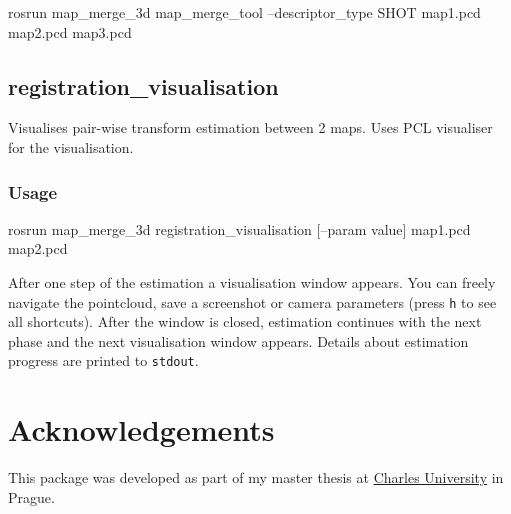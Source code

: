 \begin{code}
rosrun map_merge_3d map_merge_tool --descriptor_type SHOT map1.pcd
map2.pcd map3.pcd
\end{code}

\subsection{registration\_visualisation}

Visualises pair-wise transform estimation between 2 maps. Uses \gls{PCL} visualiser for the visualisation.

\subsubsection{Usage}

\begin{code}
rosrun map_merge_3d registration_visualisation [--param value]
map1.pcd map2.pcd
\end{code}

After one step of the estimation a visualisation window appears. You can freely navigate the pointcloud, save a screenshot or camera parameters (press \texttt{h} to see all shortcuts). After the window is closed, estimation continues with the next phase and the next visualisation window appears. Details about estimation progress are printed to \texttt{stdout}.

\section{Acknowledgements}

This package was developed as part of my master thesis at \href{http://www.mff.cuni.cz/to.en/}{Charles University} in Prague.
